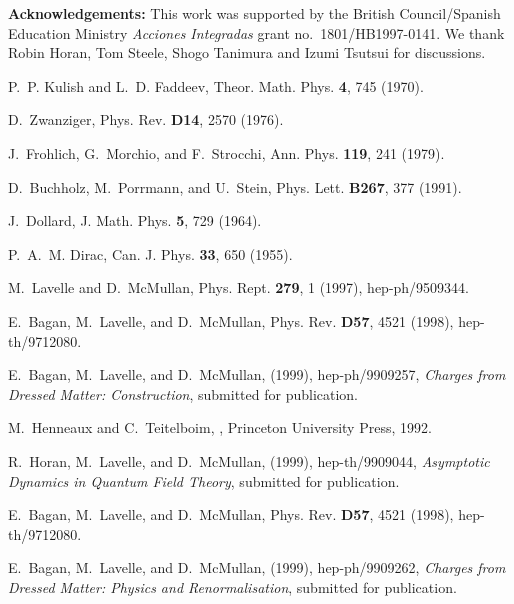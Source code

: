 \documentclass[12pt,a4paper]{article}
\newcommand{\no}{\noindent}
\begin{document}
\bigskip

\no\textbf{Acknowledgements:} This work was supported by the
British Council/Spanish Education Ministry \textit{Acciones
Integradas} grant no.\  1801/HB1997-0141. We thank Robin Horan,
Tom Steele, Shogo Tanimura and Izumi Tsutsui for discussions.



\begin{thebibliography}{10}

P.~P. Kulish and L.~D. Faddeev,
\newblock Theor. Math. Phys. {\bf 4}, 745 (1970).

D.~Zwanziger,
\newblock Phys. Rev. {\bf D14}, 2570 (1976).

J.~Frohlich, G.~Morchio, and F.~Strocchi,
\newblock Ann. Phys. {\bf 119}, 241 (1979).

D.~Buchholz, M.~Porrmann, and U.~Stein,
\newblock Phys. Lett. {\bf B267}, 377 (1991).

J.~Dollard,
\newblock J. Math. Phys. {\bf 5}, 729 (1964).

P.~A.~M. Dirac,
\newblock Can. J. Phys. {\bf 33}, 650 (1955).

M.~Lavelle and D.~McMullan,
\newblock Phys. Rept. {\bf 279}, 1 (1997), hep-ph/9509344.

E.~Bagan, M.~Lavelle, and D.~McMullan,
\newblock Phys. Rev. {\bf D57}, 4521 (1998), hep-th/9712080.

E.~Bagan, M.~Lavelle, and D.~McMullan,
\newblock (1999), hep-ph/9909257,
\newblock \textit{Charges from Dressed Matter: Construction}, submitted for publication.

M.~Henneaux and C.~Teitelboim,
, Princeton University Press,
  1992.

R.~Horan, M.~Lavelle, and D.~McMullan,
\newblock (1999), hep-th/9909044,
\newblock \textit{Asymptotic Dynamics in Quantum Field Theory}, submitted for
  publication.

E.~Bagan, M.~Lavelle, and D.~McMullan,
\newblock Phys. Rev. {\bf D57}, 4521 (1998), hep-th/9712080.

E.~Bagan, M.~Lavelle, and D.~McMullan,
\newblock (1999), hep-ph/9909262,
\newblock \textit{Charges from Dressed Matter: Physics and Renormalisation},
 submitted for publication.


\end{thebibliography}
\end{document}
